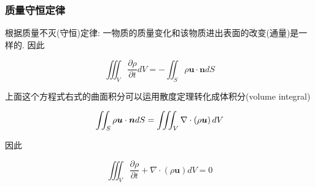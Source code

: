 \documentclass[aspectratio=2516]{beamer}
\begin{document}
\begin{frame}
\frametitle{\kaishu 质量守恒定律}

\kaishu 

根据质量不灭(守恒)定律: 一物质的质量变化和该物质进出表面的改变(通量)是一样的. 因此

\vspace{0.15cm}

\begin{equation}
\iiint_V {\frac{{\partial \rho }}{{\partial t}}dV} =  - \iint_S {\rho \boldsymbol{u} \cdot \boldsymbol{n}dS}
\label{eq5.1.5}
\end{equation}

\vspace{0.15cm}

上面这个方程式右式的曲面积分可以运用散度定理转化成体积分(volume integral)

\vspace{0.15cm}

\begin{equation}
\iint_S {\rho \boldsymbol{u} \cdot \boldsymbol{n}dS} = \iiint_V {\nabla  \cdot \left( {\rho \boldsymbol{u}} \right)dV}
\notag
\end{equation}

\vspace{0.15cm}

因此

\vspace{0.15cm}

\begin{equation}
\iiint_V {\frac{{\partial \rho }}{{\partial t}} + \nabla  \cdot \left( {\rho \boldsymbol{u}} \right)dV} = 0
\label{eq5.1.6}
\end{equation}

\end{frame}


\end{document}
